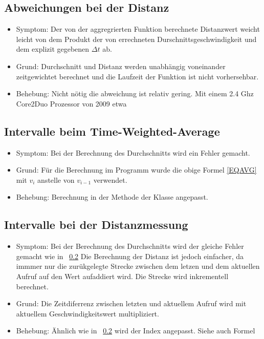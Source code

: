 \documentclass[qualitaetssicherung.tex]{subfiles}
\begin{document}
	\subsection{Abweichungen bei der Distanz} \label{DDIST}
		\begin{itemize}
			\item
			Symptom: Der von der aggregrierten Funktion  berechnete Distanzwert weicht leicht von dem Produkt der von  errechneten Durschnittsgeschwindigkeit und dem explizit gegebenen $\Delta t$ ab.
			\item
			Grund: Durchschnitt und Distanz werden unabhängig voneinander zeitgewichtet berechnet und die Laufzeit der Funktion ist nicht vorhersehbar.
			\item
			Behebung: Nicht nötig die abweichung ist relativ gering. Mit einem 2.4 Ghz Core2Duo Prozessor von 2009 etwa 

		\end{itemize}

	\subsection{Intervalle beim Time-Weighted-Average} \label{TWA}
		\begin{itemize}
			\item
			Symptom: Bei der Berechnung des Durchschnitts wird ein Fehler gemacht.
			\item
			Grund: Für die Berechnung im Programm wurde die obige Formel \eqref{EQAVG} mit $v_i$ anstelle von $v_{i-1}$ verwendet.
			\item
			Behebung: Berechnung in der Methode  der Klasse  angepasst.

		\end{itemize}

	\subsection{Intervalle bei der Distanzmessung} \label{VGL}
		\begin{itemize}
			\item
			Symptom: Bei der Berechnung des Durchschnitts wird der gleiche Fehler gemacht wie in ~\ref{TWA} Die Berechnung der Distanz ist jedoch einfacher, da immmer nur die zurükgelegte Strecke zwischen dem letzen und dem aktuellen Aufruf auf den Wert aufaddiert wird. Die Strecke wird inkrementell berechnet.
			\item
			Grund: Die Zeitdiferrenz zwischen letzten und aktuellem Aufruf wird mit aktuellem Geschwindigkeitswert multipliziert.
			\item
			Behebung: Ähnlich wie in ~\ref{TWA} wird der Index angepasst. Siehe auch Formel

		\end{itemize}
\end{document}
